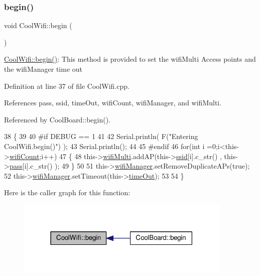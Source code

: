 \subsubsection{\texorpdfstring{begin()}{begin()}}
{\footnotesize\ttfamily void Cool\+Wifi\+::begin (\begin{DoxyParamCaption}{ }\end{DoxyParamCaption})}

\hyperlink{classCoolWifi_a46942fed90e475112cc10b78a32e7aaa}{Cool\+Wifi\+::begin()}\+: This method is provided to set the wifi\+Multi Access points and the wifi\+Manager time out 

Definition at line 37 of file Cool\+Wifi.\+cpp.



References pass, ssid, time\+Out, wifi\+Count, wifi\+Manager, and wifi\+Multi.



Referenced by Cool\+Board\+::begin().


\begin{DoxyCode}
38 \{ 
39 
40 \textcolor{preprocessor}{#if DEBUG == 1 }
41 
42     Serial.println( F(\textcolor{stringliteral}{"Entering CoolWifi.begin()"}) );
43     Serial.println();
44 
45 \textcolor{preprocessor}{#endif}
46     \textcolor{keywordflow}{for}(\textcolor{keywordtype}{int} i =0;i<this->\hyperlink{classCoolWifi_ab133bd92fcb895b884deecd6678592e4}{wifiCount};i++)
47     \{
48          this->\hyperlink{classCoolWifi_a7862a8c0d7239877e2956c14a368aab8}{wifiMulti}.addAP(this->\hyperlink{classCoolWifi_a893b21d0fed821438733bba2e73fb4c2}{ssid}[i].c\_str() , this->\hyperlink{classCoolWifi_a0c3332a149245aaad060b32593a54c9b}{pass}[i].c\_str() );    
49     \}
50 
51     this->\hyperlink{classCoolWifi_a80dd24fdc56e863f5eb9947dd65a433a}{wifiManager}.setRemoveDuplicateAPs(\textcolor{keyword}{true});
52     this->\hyperlink{classCoolWifi_a80dd24fdc56e863f5eb9947dd65a433a}{wifiManager}.setTimeout(this->\hyperlink{classCoolWifi_a952111605f25156588b5632caaba1c6f}{timeOut});  
53     
54 \}
\end{DoxyCode}
Here is the caller graph for this function\+:\nopagebreak
\begin{figure}[H]
\begin{center}
\leavevmode
\includegraphics[width=291pt]{classCoolWifi_a46942fed90e475112cc10b78a32e7aaa_icgraph}
\end{center}
\end{figure}
\mbox{\label{classCoolWifi_a4eb2f6b9b09dd588964b88b6c70122c0}} 
